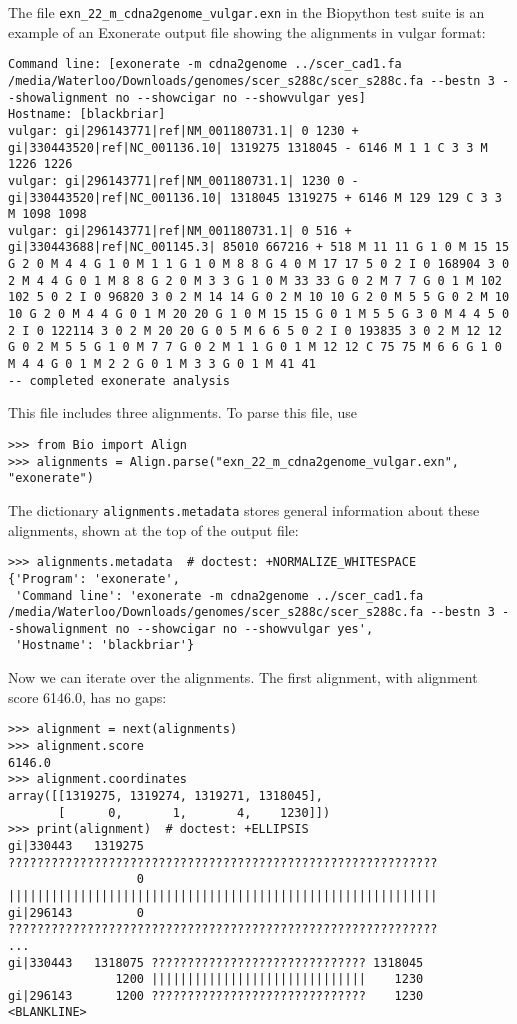 The file \verb|exn_22_m_cdna2genome_vulgar.exn| in the Biopython test suite is an example of an Exonerate output file showing the alignments in vulgar format:
\begin{verbatim}
Command line: [exonerate -m cdna2genome ../scer_cad1.fa /media/Waterloo/Downloads/genomes/scer_s288c/scer_s288c.fa --bestn 3 --showalignment no --showcigar no --showvulgar yes]
Hostname: [blackbriar]
vulgar: gi|296143771|ref|NM_001180731.1| 0 1230 + gi|330443520|ref|NC_001136.10| 1319275 1318045 - 6146 M 1 1 C 3 3 M 1226 1226
vulgar: gi|296143771|ref|NM_001180731.1| 1230 0 - gi|330443520|ref|NC_001136.10| 1318045 1319275 + 6146 M 129 129 C 3 3 M 1098 1098
vulgar: gi|296143771|ref|NM_001180731.1| 0 516 + gi|330443688|ref|NC_001145.3| 85010 667216 + 518 M 11 11 G 1 0 M 15 15 G 2 0 M 4 4 G 1 0 M 1 1 G 1 0 M 8 8 G 4 0 M 17 17 5 0 2 I 0 168904 3 0 2 M 4 4 G 0 1 M 8 8 G 2 0 M 3 3 G 1 0 M 33 33 G 0 2 M 7 7 G 0 1 M 102 102 5 0 2 I 0 96820 3 0 2 M 14 14 G 0 2 M 10 10 G 2 0 M 5 5 G 0 2 M 10 10 G 2 0 M 4 4 G 0 1 M 20 20 G 1 0 M 15 15 G 0 1 M 5 5 G 3 0 M 4 4 5 0 2 I 0 122114 3 0 2 M 20 20 G 0 5 M 6 6 5 0 2 I 0 193835 3 0 2 M 12 12 G 0 2 M 5 5 G 1 0 M 7 7 G 0 2 M 1 1 G 0 1 M 12 12 C 75 75 M 6 6 G 1 0 M 4 4 G 0 1 M 2 2 G 0 1 M 3 3 G 0 1 M 41 41
-- completed exonerate analysis
\end{verbatim}
This file includes three alignments. To parse this file, use
\begin{verbatim}
>>> from Bio import Align
>>> alignments = Align.parse("exn_22_m_cdna2genome_vulgar.exn", "exonerate")
\end{verbatim}
The dictionary \verb|alignments.metadata| stores general information about these alignments, shown at the top of the output file:
\begin{verbatim}
>>> alignments.metadata  # doctest: +NORMALIZE_WHITESPACE
{'Program': 'exonerate',
 'Command line': 'exonerate -m cdna2genome ../scer_cad1.fa /media/Waterloo/Downloads/genomes/scer_s288c/scer_s288c.fa --bestn 3 --showalignment no --showcigar no --showvulgar yes',
 'Hostname': 'blackbriar'}
\end{verbatim}
Now we can iterate over the alignments. The first alignment, with alignment score 6146.0, has no gaps:
\begin{verbatim}
>>> alignment = next(alignments)
>>> alignment.score
6146.0
>>> alignment.coordinates
array([[1319275, 1319274, 1319271, 1318045],
       [      0,       1,       4,    1230]])
>>> print(alignment)  # doctest: +ELLIPSIS
gi|330443   1319275 ????????????????????????????????????????????????????????????
                  0 ||||||||||||||||||||||||||||||||||||||||||||||||||||||||||||
gi|296143         0 ????????????????????????????????????????????????????????????
...
gi|330443   1318075 ?????????????????????????????? 1318045
               1200 ||||||||||||||||||||||||||||||    1230
gi|296143      1200 ??????????????????????????????    1230
<BLANKLINE>
\end{verbatim}
